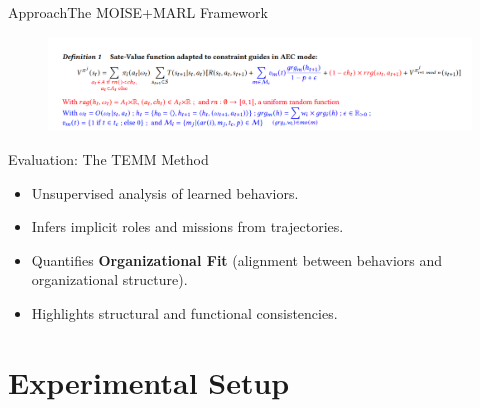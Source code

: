 \documentclass[9pt, aspectratio=169]{beamer}
\begin{document}
\begin{frame}{Approach}{The MOISE+MARL Framework}
  \begin{figure}
    \hspace{-0.76cm}
    \includegraphics[width=1.05\linewidth]{figures/modified_state_value_function.png}
  \end{figure}
\end{frame}

\begin{frame}{Evaluation: The TEMM Method}
  \begin{itemize}
    \item Unsupervised analysis of learned behaviors.
    \item Infers implicit roles and missions from trajectories.
    \item Quantifies \textbf{Organizational Fit} (alignment between behaviors and organizational structure).
    \item Highlights structural and functional consistencies.
  \end{itemize}
\end{frame}

\section{Experimental Setup}
\end{document}
